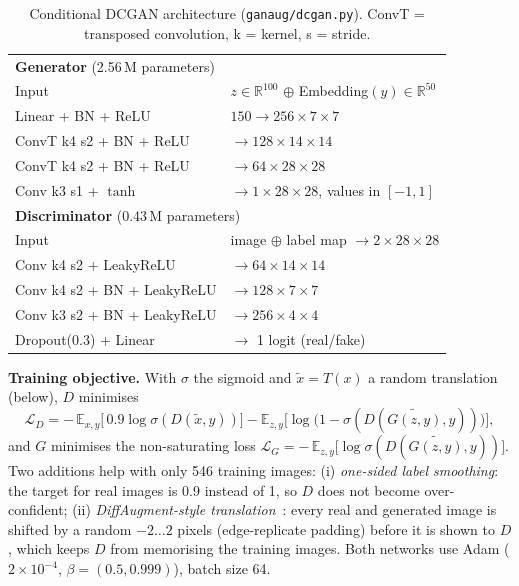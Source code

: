 \begin{table}[htbp]
\centering
\caption{Conditional DCGAN architecture (\texttt{ganaug/dcgan.py}). ConvT = transposed convolution, k = kernel, s = stride.}
\label{tab:gan}
\small
\begin{tabular}{ll}
\toprule
\multicolumn{2}{l}{\textbf{Generator} (2.56\,M parameters)} \\
Input & $z\in\mathbb{R}^{100}$ $\oplus$ Embedding$(y)\in\mathbb{R}^{50}$ \\
Linear + BN + ReLU & $150 \rightarrow 256\times7\times7$ \\
ConvT k4 s2 + BN + ReLU & $\rightarrow 128\times14\times14$ \\
ConvT k4 s2 + BN + ReLU & $\rightarrow 64\times28\times28$ \\
Conv k3 s1 + $\tanh$ & $\rightarrow 1\times28\times28$, values in $[-1,1]$ \\
\midrule
\multicolumn{2}{l}{\textbf{Discriminator} (0.43\,M parameters)} \\
Input & image $\oplus$ label map $\rightarrow 2\times28\times28$ \\
Conv k4 s2 + LeakyReLU & $\rightarrow 64\times14\times14$ \\
Conv k4 s2 + BN + LeakyReLU & $\rightarrow 128\times7\times7$ \\
Conv k3 s2 + BN + LeakyReLU & $\rightarrow 256\times4\times4$ \\
Dropout(0.3) + Linear & $\rightarrow$ 1 logit (real/fake) \\
\bottomrule
\end{tabular}
\end{table}

\textbf{Training objective.} With $\sigma$ the sigmoid and $\tilde{x}=T(x)$ a random translation (below), $D$ minimises
\begin{equation}
\mathcal{L}_D = -\,\mathbb{E}_{x,y}\big[\,0.9\log\sigma(D(\tilde{x},y))\big] - \mathbb{E}_{z,y}\big[\log\big(1-\sigma(D(\widetilde{G(z,y)},y))\big)\big],
\end{equation}
and $G$ minimises the non-saturating loss $\mathcal{L}_G = -\,\mathbb{E}_{z,y}\big[\log\sigma(D(\widetilde{G(z,y)},y))\big]$.
Two additions help with only 546 training images:
(i) \emph{one-sided label smoothing}: the target for real images is 0.9 instead of 1, so $D$ does not become over-confident;
(ii) \emph{DiffAugment-style translation}~\cite{zhao2020diffaugment}: every real and generated image is shifted by a random
$-2\ldots2$ pixels (edge-replicate padding) before it is shown to $D$, which keeps $D$ from memorising the training images.
Both networks use Adam ($2\times10^{-4}$, $\beta=(0.5,0.999)$), batch size 64.

